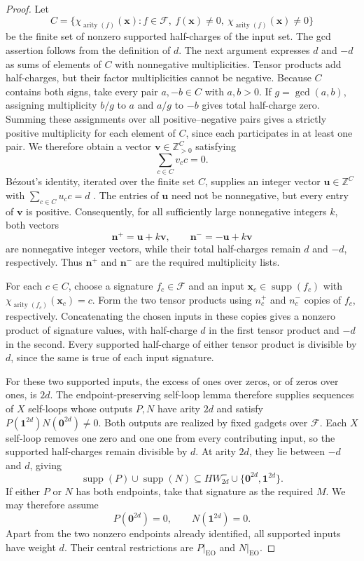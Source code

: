 \documentclass[11pt,letterpaper,onecolumn]{article}
\theoremstyle{plain}
\theoremstyle{definition}
\theoremstyle{remark}
\newcommand{\cF}{\mathcal F}
\newcommand{\supp}{\operatorname{supp}}
\newcommand{\arity}{\operatorname{arity}}
\newcommand{\EO}{\mathrm{EO}}
\newcommand{\one}{\mathbf 1}
\newcommand{\zero}{\mathbf 0}
\begin{document}
	\begin{proof}
		Let
		\[
		C=\{\chi_{\arity(f)}({\mathbf x}):
		f\in\cF,\ f({\mathbf x})\ne0,\ \chi_{\arity(f)}({\mathbf x})\ne0\}
		\]
		be the finite set of nonzero supported half-charges of the input set.
		The gcd assertion follows from the definition of \(d\).
		The next argument expresses \(d\) and \(-d\) as sums of elements of
		\(C\) with nonnegative multiplicities.  Tensor products add half-charges, but their factor
		multiplicities cannot be negative.  Because \(C\) contains both signs, take every pair
		\(a,-b\in C\) with \(a,b>0\).  If \(g=\gcd(a,b)\), assigning multiplicity
		\(b/g\) to \(a\) and \(a/g\) to \(-b\) gives total half-charge zero.  Summing
		these assignments over all positive--negative pairs gives a strictly
		positive multiplicity for each element of \(C\), since each participates
		in at least one pair.  We therefore obtain a vector
		\({\mathbf v}\in\mathbb Z_{>0}^C\) satisfying
		\[
		\sum_{c\in C}v_c c=0.
		\]
		Bézout's identity, iterated over the finite set \(C\), supplies an integer
		vector \({\mathbf u}\in\mathbb Z^C\) with \(\sum_{c\in C}u_c c=d\)
		\cite[Section~1.3, Theorem~1.2]{Apostol1976}.  The entries of \({\mathbf u}\) need not be
		nonnegative, but every entry of \({\mathbf v}\) is positive.  Consequently, for all sufficiently
		large nonnegative integers \(k\), both vectors
		\[
		{\mathbf n}^+={\mathbf u}+k{\mathbf v},\qquad {\mathbf n}^-=-{\mathbf u}+k{\mathbf v}
		\]
		are nonnegative integer vectors, while their total half-charges remain \(d\)
		and \(-d\), respectively.  Thus \({\mathbf n}^+\) and \({\mathbf n}^-\) are the required
		multiplicity lists.
		
For each \(c\in C\), choose a signature \(f_c\in\cF\) and an input
\({\mathbf x}_c\in\supp(f_c)\) with \(\chi_{\arity(f_c)}({\mathbf x}_c)=c\).
Form the two tensor products using \(n_c^+\) and \(n_c^-\) copies of
\(f_c\), respectively.  Concatenating the chosen inputs in these copies
gives a nonzero product of signature values, with half-charge \(d\) in
the first tensor product and \(-d\) in the second.  Every supported
half-charge of either tensor product is divisible by \(d\), since the
same is true of each input signature.

For these two supported inputs, the excess of ones over zeros, or of
zeros over ones, is \(2d\).  The endpoint-preserving self-loop lemma
\cite[full version, Lemma~40; conference version, Lemma~37]{MengWangXiaZheng2025}
therefore supplies sequences of \(X\) self-loops whose outputs
\(P,N\) have arity \(2d\) and satisfy
\(P(\one^{2d})N(\zero^{2d})\ne0\).
Both outputs are realized by fixed gadgets over \(\cF\).
Each \(X\) self-loop removes one zero and one one from every
contributing input, so the supported half-charges remain divisible by
\(d\).  At arity \(2d\), they lie between \(-d\) and \(d\), giving
\[
\supp(P)\cup\supp(N)
\subseteq
HW_{2d}^=\cup\{\zero^{2d},\one^{2d}\}.
\]
		If either \(P\) or \(N\) has both endpoints, take that signature as the
		required \(M\).
		We may therefore assume
		\[
		P(\zero^{2d})=0,
		\qquad
		N(\one^{2d})=0.
		\]
		Apart from the two nonzero endpoints already identified, all supported
		inputs have weight \(d\). Their central restrictions are \(P|_{\EO}\) and \(N|_{\EO}\).
		

\end{proof}
\end{document}
